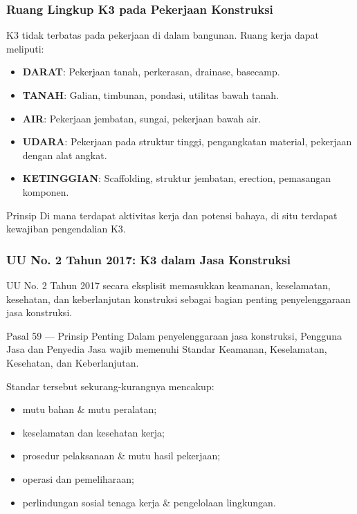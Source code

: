 \documentclass[../main.tex]{subfiles}
\begin{document}
\begin{frame}[mytitle=center,t,mycolor=white]
	\frametitle{Ruang Lingkup K3 pada Pekerjaan Konstruksi}

	K3 tidak terbatas pada pekerjaan di dalam bangunan. Ruang kerja dapat meliputi:
	\begin{itemize}
		\item \textbf{DARAT}: Pekerjaan tanah, perkerasan, drainase, basecamp.
		\item \textbf{TANAH}: Galian, timbunan, pondasi, utilitas bawah tanah.
		\item \textbf{AIR}: Pekerjaan jembatan, sungai, pekerjaan bawah air.
		\item \textbf{UDARA}: Pekerjaan pada struktur tinggi, pengangkatan material, pekerjaan dengan alat angkat.
		\item \textbf{KETINGGIAN}: Scaffolding, struktur jembatan, erection, pemasangan komponen.
	\end{itemize}

	\vspace{0.3cm}
	\begin{exampleblock}{Prinsip}
		Di mana terdapat aktivitas kerja dan potensi bahaya, di situ terdapat kewajiban pengendalian K3.
	\end{exampleblock}
\end{frame}

\begin{frame}[mytitle=standard,t,mycolor=digiPH_ocean!10]
	\frametitle{UU No. 2 Tahun 2017: K3 dalam Jasa Konstruksi}

	UU No. 2 Tahun 2017 secara eksplisit memasukkan keamanan, keselamatan, kesehatan, dan keberlanjutan konstruksi sebagai bagian penting penyelenggaraan jasa konstruksi.

	\begin{block}{Pasal 59 — Prinsip Penting}
		Dalam penyelenggaraan jasa konstruksi, Pengguna Jasa dan Penyedia Jasa wajib memenuhi Standar Keamanan, Keselamatan, Kesehatan, dan Keberlanjutan.
	\end{block}

	Standar tersebut sekurang-kurangnya mencakup:
	\begin{itemize}
		\item mutu bahan \& mutu peralatan;
		\item keselamatan dan kesehatan kerja;
		\item prosedur pelaksanaan \& mutu hasil pekerjaan;
		\item operasi dan pemeliharaan;
		\item perlindungan sosial tenaga kerja \& pengelolaan lingkungan.
	\end{itemize}
\end{frame}
\end{document}

